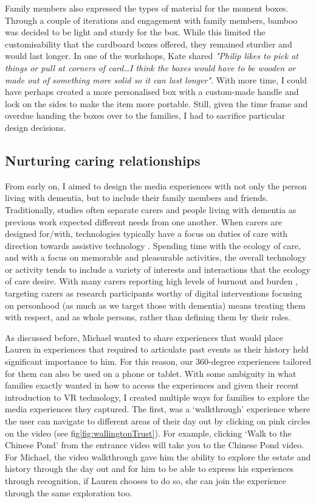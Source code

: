 Family members also expressed the types of material for the moment boxes. Through a couple of iterations and engagement with family members, bamboo was decided to be light and sturdy for the box. While this limited the customisability that the cardboard boxes offered, they remained sturdier and would last longer. In one of the workshops, Kate shared \textit{"Philip likes to pick at things or pull at corners of card…I think the boxes would have to be wooden or made out of something more solid so it can last longer"}. With more time, I could have perhaps created a more personalised box with a custom-made handle and lock on the sides to make the item more portable. Still, given the time frame and overdue handing the boxes over to the families, I had to sacrifice particular design decisions.

\subsection{Nurturing caring relationships}
\label{momentBoxes:caringRelationships}
From early on, I aimed to design the media experiences with not only the person living with dementia, but to include their family members and friends. Traditionally, studies often separate carers and people living with dementia as previous work expected different needs from one another. When carers are designed for/with, technologies typically have a focus on duties of care with direction towards assistive technology  \citep{bennett_assistive_2017, bharucha2009intelligent,gibson2015everyday}. Spending time with the ecology of care, and with a focus on memorable and pleasurable activities, the overall technology or activity tends to include a variety of interests and interactions that the ecology of care desire. With many carers reporting high levels of burnout and burden \citep{takai_experience_2009}, targeting carers as research participants worthy of digital interventions focusing on personhood (as much as we target those with dementia) means treating them with respect, and as whole persons, rather than defining them by their roles. 

As discussed before, Michael wanted to share experiences that would place Lauren in experiences that required to articulate past events as their history held significant importance to him. For this reason, our 360-degree experiences tailored for them can also be used on a phone or tablet. With some ambiguity in what families exactly wanted in how to access the experiences and given their recent introduction to VR technology, I created multiple ways for families to explore the media experiences they captured. The first, was a ‘walkthrough’ experience where the user can navigate to different areas of their day out by clicking on pink circles on the video (see fig\ref{fig:wallingtonTrust}). For example, clicking ‘Walk to the Chinese Pond’ from the entrance video will take you to the Chinese Pond video. For Michael, the video walkthrough gave him the ability to explore the estate and history through the day out and for him to be able to express his experiences through recognition, if Lauren chooses to do so, she can join the experience through the same exploration too. 

